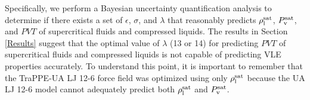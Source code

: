 \documentclass[journal=jctc,manuscript=article]{achemso}
\begin{document}
Specifically, we perform a Bayesian uncertainty quantification analysis to determine if there exists a set of $\epsilon$, $\sigma$, and $\lambda$ that reasonably predicts $\rho_{\rm l}^{\rm sat}$, $P_{\rm v}^{\rm sat}$, and $PVT$ of supercritical fluids and compressed liquids. The results in Section \ref{Results} suggest that the optimal value of $\lambda$ (13 or 14) for predicting $PVT$ of supercritical fluids and compressed liquids is not capable of predicting VLE properties accurately. To understand this point, it is important to remember that the TraPPE-UA LJ 12-6 force field was optimized using only $\rho_{\rm l}^{\rm sat}$ because the UA LJ 12-6 model cannot adequately predict both $\rho_{\rm l}^{\rm sat}$ and $P_{\rm v}^{\rm sat}$.





\end{document}
